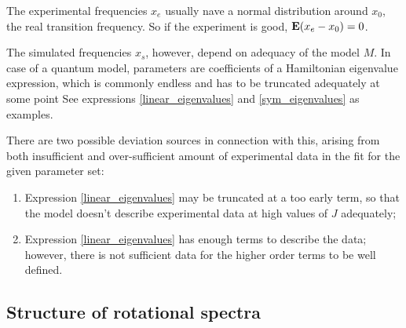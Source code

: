 \documentclass[11pt]{article}
\begin{document}
The experimental frequencies $x_e$ usually nave a normal distribution around $x_0$, the real transition frequency. So if the experiment is good, $\mathbf{E} (x_e - x_0) = 0$. 

The simulated frequencies $x_s$, however, depend on adequacy of the model $M$. In case of a quantum model, parameters are coefficients of a Hamiltonian eigenvalue expression, which is commonly endless and has to be truncated adequately at some point See expressions \ref{linear_eigenvalues} and \ref{sym_eigenvalues} as examples.

There are two possible deviation sources in connection with this, arising from both insufficient and over-sufficient amount of experimental data in the fit for the given parameter set:
\begin{enumerate}
	\item Expression \ref{linear_eigenvalues} may be truncated at a too early term, so that the model doesn't describe experimental data at high values of $J$ adequately;
	\item Expression \ref{linear_eigenvalues} has enough terms to describe the data; however, there is not sufficient data for the higher order terms to be well defined. 
\end{enumerate}

\subsection{Structure of rotational spectra}
\end{document}

